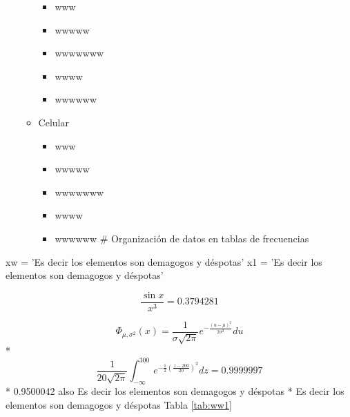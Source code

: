 \documentclass[10pt,]{krantz}
\newenvironment{Shaded}{\begin{snugshade}}{\end{snugshade}}
\newcommand{\NormalTok}[1]{#1}
\newcommand{\StringTok}[1]{\textcolor[rgb]{0.31,0.60,0.02}{#1}}
\providecommand{\tightlist}{%
  \setlength{\itemsep}{0pt}\setlength{\parskip}{0pt}}
\theoremstyle{definition}
\theoremstyle{definition}
\theoremstyle{definition}
\theoremstyle{definition}
\theoremstyle{remark}
\begin{document}
\begin{enumerate}
\begin{itemize}
    \begin{itemize}
    \tightlist
    \item
      www
    \item
      wwwww
    \item
      wwwwwww
    \item
      wwww
    \item
      wwwwww
    \end{itemize}
  \item
    Celular

    \begin{itemize}
    \tightlist
    \item
      www
    \item
      wwwww
    \item
      wwwwwww
    \item
      wwww
    \item
      wwwwww
      \# Organización de datos en tablas de frecuencias
    \end{itemize}
  \end{itemize}
\end{enumerate}

\begin{Shaded}
\begin{Highlighting}[]
\NormalTok{xw =}\StringTok{ 'Es decir los elementos son demagogos y déspotas'} 
\NormalTok{x1 =}\StringTok{ 'Es decir los elementos son demagogos y déspotas'} 
\end{Highlighting}
\end{Shaded}

\[
\frac{\sin x}{x^3}
= 0.3794281
\]

\[
\Phi_{\mu , \sigma ^{2}}(x)=\frac {1}{\sigma {\sqrt {2\pi }}}e^{-{\frac {(u-\mu )^{2}}{2\sigma ^{2}}}}du
\]
* \[\frac{1}{20\sqrt{2\pi }}\int_{-\infty }^{ 300}e^{- \frac{1}{2}\left(\frac{z-200}{20}\right)^2}dz=0.9999997\]
* 0.9500042 also Es decir los elementos son demagogos y déspotas
* Es decir los elementos son demagogos y déspotas
Tabla \ref{tab:ww1}
\end{document}
